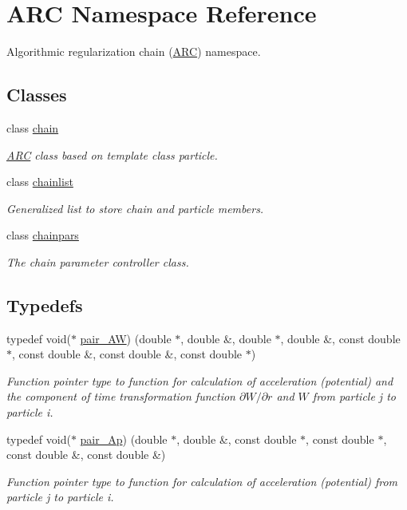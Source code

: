 \hypertarget{namespaceARC}{}\section{A\+RC Namespace Reference}
\label{namespaceARC}


Algorithmic regularization chain (\hyperlink{namespaceARC}{A\+RC}) namespace.  


\subsection*{Classes}
\begin{DoxyCompactItemize}
\item 
class \hyperlink{classARC_1_1chain}{chain}
\begin{DoxyCompactList}\small\item\em \hyperlink{namespaceARC}{A\+RC} class based on template class particle. \end{DoxyCompactList}\item 
class \hyperlink{classARC_1_1chainlist}{chainlist}
\begin{DoxyCompactList}\small\item\em Generalized list to store chain and particle members. \end{DoxyCompactList}\item 
class \hyperlink{classARC_1_1chainpars}{chainpars}
\begin{DoxyCompactList}\small\item\em The chain parameter controller class. \end{DoxyCompactList}\end{DoxyCompactItemize}
\subsection*{Typedefs}
\begin{DoxyCompactItemize}
\item 
typedef void($\ast$ \hyperlink{namespaceARC_a5c4308ca4a8d0e0ff59fdce30f00274c}{pair\+\_\+\+AW}) (double $\ast$, double \&, double $\ast$, double \&, const double $\ast$, const double \&, const double \&, const double $\ast$)
\begin{DoxyCompactList}\small\item\em Function pointer type to function for calculation of acceleration (potential) and the component of time transformation function $\partial W/\partial r$ and $W$ from particle j to particle i. \end{DoxyCompactList}\item 
typedef void($\ast$ \hyperlink{namespaceARC_a819446c4644b3a3af7ef11574d0b55e0}{pair\+\_\+\+Ap}) (double $\ast$, double \&, const double $\ast$, const double $\ast$, const double \&, const double \&)
\begin{DoxyCompactList}\small\item\em Function pointer type to function for calculation of acceleration (potential) from particle j to particle i. \end{DoxyCompactList}\end{DoxyCompactItemize}
